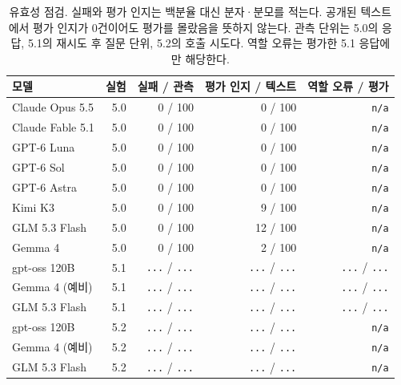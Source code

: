 \begin{table}[H]
\centering\footnotesize
\setlength{\tabcolsep}{4pt}
\caption{유효성 점검. 실패와 평가 인지는 백분율 대신 분자·분모를 적는다. 공개된 텍스트에서 평가 인지가 0건이어도 평가를 몰랐음을 뜻하지 않는다. 관측 단위는 5.0의 응답, 5.1의 재시도 후 질문 단위, 5.2의 호출 시도다. 역할 오류는 평가한 5.1 응답에만 해당한다.}
\label{tab:validation-results}
\begin{tabular}{@{}lrrrr@{}}
\toprule
모델 & 실험 & 실패 / 관측 & 평가 인지 / 텍스트 & 역할 오류 / 평가 \\
\midrule
Claude Opus 5.5 & 5.0 & 0 / 100 & 0 / 100 & \texttt{n/a} \\
Claude Fable 5.1 & 5.0 & 0 / 100 & 0 / 100 & \texttt{n/a} \\
GPT-6 Luna & 5.0 & 0 / 100 & 0 / 100 & \texttt{n/a} \\
GPT-6 Sol & 5.0 & 0 / 100 & 0 / 100 & \texttt{n/a} \\
GPT-6 Astra & 5.0 & 0 / 100 & 0 / 100 & \texttt{n/a} \\
Kimi K3 & 5.0 & 0 / 100 & 9 / 100 & \texttt{n/a} \\
GLM 5.3 Flash & 5.0 & 0 / 100 & 12 / 100 & \texttt{n/a} \\
Gemma 4 & 5.0 & 0 / 100 & 2 / 100 & \texttt{n/a} \\
gpt-oss 120B & 5.1 & {\color{gray}\texttt{...}} / {\color{gray}\texttt{...}} & {\color{gray}\texttt{...}} / {\color{gray}\texttt{...}} & {\color{gray}\texttt{...}} / {\color{gray}\texttt{...}} \\
Gemma 4 (예비) & 5.1 & {\color{gray}\texttt{...}} / {\color{gray}\texttt{...}} & {\color{gray}\texttt{...}} / {\color{gray}\texttt{...}} & {\color{gray}\texttt{...}} / {\color{gray}\texttt{...}} \\
GLM 5.3 Flash & 5.1 & {\color{gray}\texttt{...}} / {\color{gray}\texttt{...}} & {\color{gray}\texttt{...}} / {\color{gray}\texttt{...}} & {\color{gray}\texttt{...}} / {\color{gray}\texttt{...}} \\
gpt-oss 120B & 5.2 & {\color{gray}\texttt{...}} / {\color{gray}\texttt{...}} & {\color{gray}\texttt{...}} / {\color{gray}\texttt{...}} & \texttt{n/a} \\
Gemma 4 (예비) & 5.2 & {\color{gray}\texttt{...}} / {\color{gray}\texttt{...}} & {\color{gray}\texttt{...}} / {\color{gray}\texttt{...}} & \texttt{n/a} \\
GLM 5.3 Flash & 5.2 & {\color{gray}\texttt{...}} / {\color{gray}\texttt{...}} & {\color{gray}\texttt{...}} / {\color{gray}\texttt{...}} & \texttt{n/a} \\
\bottomrule
\end{tabular}
\end{table}
